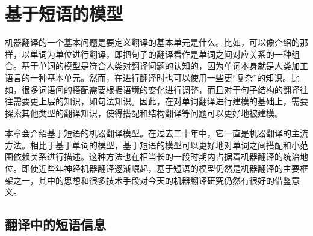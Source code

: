 
%


\renewcommand\figurename{图}%
\renewcommand\tablename{表}%


\chapter{基于短语的模型}

\parinterval 机器翻译的一个基本问题是要定义翻译的基本单元是什么。比如，可以像{\chapterfive}介绍的那样，以单词为单位进行翻译，即把句子的翻译看作是单词之间对应关系的一种组合。基于单词的模型是符合人类对翻译问题的认知的，因为单词本身就是人类加工语言的一种基本单元。然而，在进行翻译时也可以使用一些更“复杂”的知识。比如，很多词语间的搭配需要根据语境的变化进行调整，而且对于句子结构的翻译往往需要更上层的知识，如句法知识。因此，在对单词翻译进行建模的基础上，需要探索其他类型的翻译知识，使得搭配和结构翻译等问题可以更好地被建模。

\parinterval 本章会介绍基于短语的机器翻译模型。在过去二十年中，它一直是机器翻译的主流方法。相比于基于单词的模型，基于短语的模型可以更好地对单词之间搭配和小范围依赖关系进行描述。这种方法也在相当长的一段时期内占据着机器翻译的统治地位。即使近些年神经机器翻译逐渐崛起，基于短语的模型仍然是机器翻译的主要框架之一，其中的思想和很多技术手段对今天的机器翻译研究仍然有很好的借鉴意义。


\section{翻译中的短语信息}

